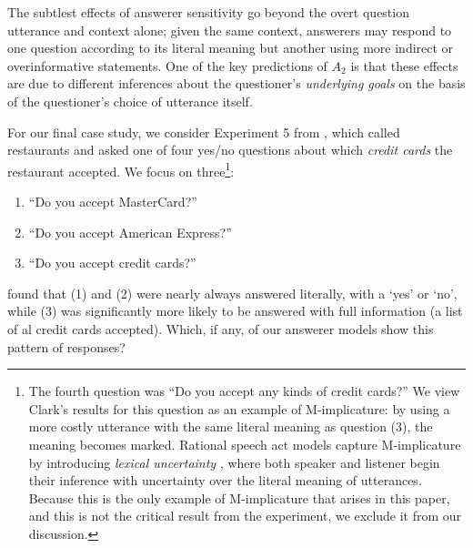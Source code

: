 \documentclass[11pt, floatsintext]{apa6}
\begin{document}
The subtlest effects of answerer sensitivity go beyond the overt question utterance and context alone; given the same context, answerers may respond to one question according to its literal meaning but another using more indirect or overinformative statements. One of the key predictions of  $A_2$ is that these effects are due to different inferences about the questioner's \emph{underlying goals} on the basis of the questioner's choice of utterance itself. 

For our final case study, we consider Experiment 5 from , which called restaurants and asked one of four yes/no questions about which \emph{credit cards} the restaurant accepted. We focus on three\footnote{
The fourth question was ``Do you accept any kinds of credit cards?'' We view Clark's results for this question as an example of M-implicature: by using a more costly utterance with the same literal meaning as question (3), the meaning becomes marked. Rational speech act models capture M-implicature by introducing \emph{lexical uncertainty} \cite{BergenGoodmanLevy12_Alternatives}, where both speaker and listener begin their inference with uncertainty over the literal meaning of utterances. %
Because this is the only example of M-implicature that arises in this paper, and this is not the critical result from the experiment, we exclude it from our discussion.%
}:
\begin{enumerate}
\item ``Do you accept MasterCard?'' 
\item ``Do you accept American Express?''
\item ``Do you accept credit cards?'' 
\end{enumerate}
 found that (1) and (2) were nearly always answered literally, with a `yes' or `no', while (3) was significantly more likely to be answered with full information (a list of al credit cards accepted). Which, if any, of our answerer models show this pattern of responses? %
\end{document}
